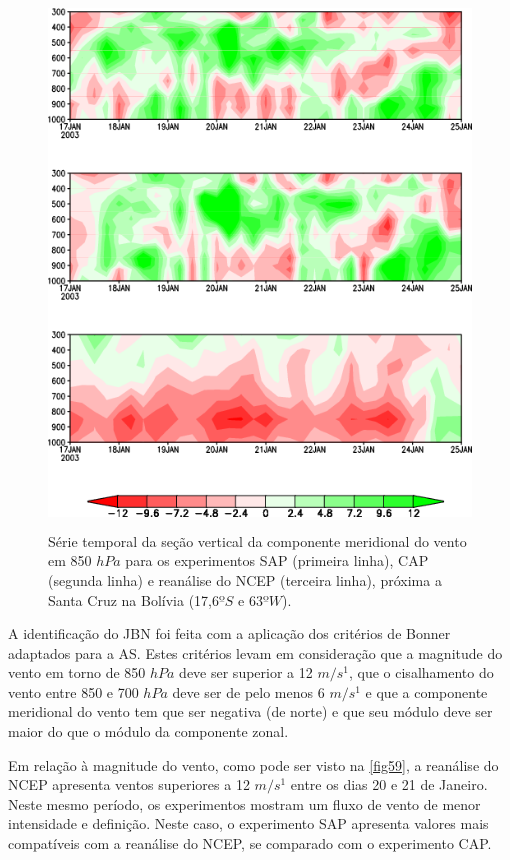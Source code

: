 \begin{figure}
\includegraphics[height=14cm]{./figs/jatos.png}
\centering
\caption{Série temporal da seção vertical da componente meridional do vento em 850 $hPa$ para os experimentos SAP (primeira linha), CAP (segunda linha) e reanálise do NCEP (terceira linha), próxima a Santa Cruz na Bolívia (17,6$ºS$ e 63$ºW$).}
\label{fig59}
\end{figure}

A identificação do JBN foi feita com a aplicação dos critérios de Bonner \cite{bonner68} adaptados para a AS. Estes critérios levam em consideração que a magnitude do vento em torno de 850 $hPa$ deve ser superior a 12 $m/s^{1}$, que o cisalhamento do vento entre 850 e 700 $hPa$ deve ser de pelo menos 6 $m/s^{1}$ e que a componente meridional do vento tem que ser negativa (de norte) e que seu módulo deve ser maior do que o módulo da componente zonal.

Em relação à magnitude do vento, como pode ser visto na \autoref{fig59}, a reanálise do NCEP apresenta ventos superiores a 12 $m/s^{1}$ entre os dias 20 e 21 de Janeiro. Neste mesmo período, os experimentos mostram um fluxo de vento de menor intensidade e definição. Neste caso, o experimento SAP apresenta valores mais compatíveis com a reanálise do NCEP, se comparado com o experimento CAP.

